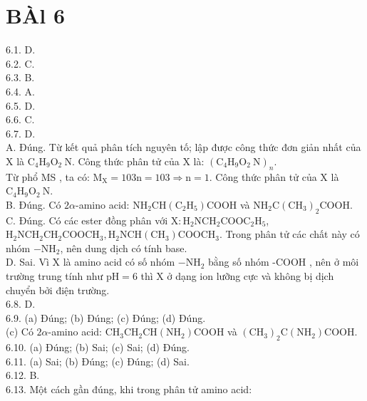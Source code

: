 \documentclass[10pt]{article}
\begin{document}
\section*{BÀl 6}
6.1. D.\\
6.2. C.\\
6.3. B.\\
6.4. A.\\
6.5. D.\\
6.6. C.\\
6.7. D.\\
A. Đúng. Từ kết quả phân tích nguyên tố; lập được công thức đơn giản nhất của X là $\mathrm{C}_{4} \mathrm{H}_{9} \mathrm{O}_{2} \mathrm{~N}$. Công thức phân tử của X là: $\left(\mathrm{C}_{4} \mathrm{H}_{9} \mathrm{O}_{2} \mathrm{~N}\right)_{n}$.\\
Từ phổ MS , ta có: $\mathrm{M}_{\mathrm{X}}=103 \mathrm{n}=103 \Rightarrow \mathrm{n}=1$. Công thức phân tử của X là $\mathrm{C}_{4} \mathrm{H}_{9} \mathrm{O}_{2} \mathrm{~N}$.\\
B. Đúng. Có $2 \alpha$-amino acid: $\mathrm{NH}_{2} \mathrm{CH}\left(\mathrm{C}_{2} \mathrm{H}_{5}\right) \mathrm{COOH}$ và $\mathrm{NH}_{2} \mathrm{C}\left(\mathrm{CH}_{3}\right)_{2} \mathrm{COOH}$.\\
C. Đúng. Có các ester đồng phân với $\mathrm{X}: \mathrm{H}_{2} \mathrm{NCH}_{2} \mathrm{COOC}_{2} \mathrm{H}_{5}$, $\mathrm{H}_{2} \mathrm{NCH}_{2} \mathrm{CH}_{2} \mathrm{COOCH}_{3}, \mathrm{H}_{2} \mathrm{NCH}\left(\mathrm{CH}_{3}\right) \mathrm{COOCH}_{3}$. Trong phân tử các chất này có nhóm $-\mathrm{NH}_{2}$, nên dung dịch có tính base.\\
D. Sai. Vì X là amino acid có số nhóm $-\mathrm{NH}_{2}$ bằng số nhóm -COOH , nên ở môi trường trung tính như $\mathrm{pH}=6$ thì X ở dạng ion lưỡng cực và không bị dịch chuyển bởi điện trường.\\
6.8. D.\\
6.9. (a) Đúng; (b) Đúng; (c) Đúng; (d) Đúng.\\
(c) Có $2 \alpha$-amino acid: $\mathrm{CH}_{3} \mathrm{CH}_{2} \mathrm{CH}\left(\mathrm{NH}_{2}\right) \mathrm{COOH}$ và $\left(\mathrm{CH}_{3}\right)_{2} \mathrm{C}\left(\mathrm{NH}_{2}\right) \mathrm{COOH}$.\\
6.10. (a) Đúng; (b) Sai; (c) Sai; (d) Đúng.\\
6.11. (a) Sai; (b) Đúng; (c) Đúng; (d) Sai.\\
6.12. B.\\
6.13. Một cách gần đúng, khi trong phân tử amino acid:
\end{document}
